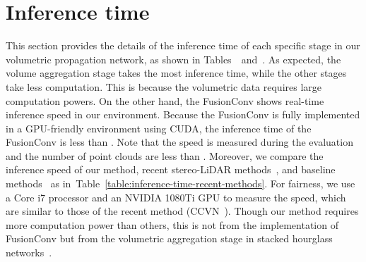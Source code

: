 \documentclass[letterpaper, 10 pt, conference]{ieeeconf}
\newcommand{\Tref}[1]{Table~\textcolor{blue}{\ref{#1}}}
\newcommand{\RNum}[1]{\uppercase\expandafter{\romannumeral #1\relax}}
\begin{document}
\section{Inference time}
\label{supp-sec:Inference time}
This section provides the details of the inference time of each specific stage in our volumetric propagation network, as shown in Tables~\textcolor{blue}{\RNum{2}}~and~\textcolor{blue}{\RNum{3}}. As expected, the volume aggregation stage takes the most inference time, while the other stages take less computation. This is because the volumetric data requires large computation powers. 
On the other hand, the FusionConv shows real-time inference speed in our environment. Because the FusionConv is fully implemented in a GPU-friendly environment using CUDA, the inference time of the FusionConv is less than . Note that the speed is measured during the evaluation and the number of point clouds are less than . Moreover, we compare the inference speed of our method, recent stereo-LiDAR methods~\cite{stereolidar_00,stereolidar_norm_costV_ccvn}, and baseline methods~\cite{gcnet,psmnet} as in~\Tref{table:inference-time-recent-methods}. For fairness, we use a Core i7 processor and an NVIDIA 1080Ti GPU to measure the speed, which are similar to those of the recent method (CCVN~\cite{stereolidar_norm_costV_ccvn}). Though our method requires more computation power than others, this is not from the implementation of FusionConv but from the volumetric aggregation stage in stacked hourglass networks~\cite{hourglass,psmnet}. 
\end{document}
